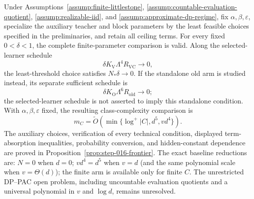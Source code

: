 \begin{corollary}\label{cor:frontier}
Under Assumptions~\ref{assump:finite-littlestone},
\ref{assump:countable-evaluation-quotient},
\ref{assump:realizable-iid}, and
\ref{assump:approximate-dp-regime}, fix
$\alpha,\beta,\varepsilon$, specialize the auxiliary teacher and block
parameters by the least feasible choices specified in the preliminaries,
and retain all ceiling terms.  For every fixed $0<\delta<1$, the complete
finite-parameter comparison is valid.  Along the selected-learner schedule
\[
 \delta K_{\mathrm V}\Lambda^{4}R_{\mathrm{VC}}\longrightarrow0,
\]
the least-threshold choice satisfies $N_*\delta\to0$.  If the standalone
old arm is studied instead, its separate sufficient schedule is
\[
 \delta K_{\mathrm O}\Lambda^{6}R_{\mathrm{old}}\longrightarrow0;
\]
the selected-learner schedule is not asserted to imply this standalone
condition.  With $\alpha,\beta,\varepsilon$ fixed, the resulting
class-complexity comparison is
\[
 m_C=\widetilde O\!\left(\min\{\log^+|C|,d^5,vd^4\}\right).
\]
The auxiliary choices, verification of every technical condition, displayed
term-absorption inequalities, probability conversion, and hidden-constant
dependence are proved in Proposition~\ref{prop:step-016-frontier}.
The exact baseline reductions are: $N=0$ when $d=0$; $vd^4=d^5$ when
$v=d$ (and the same polynomial scale when $v=\Theta(d)$); the finite arm is
available only for finite $C$. The unrestricted DP--PAC open problem,
including uncountable evaluation quotients and a universal polynomial in
$v$ and $\log d$, remains unresolved.
\end{corollary}
